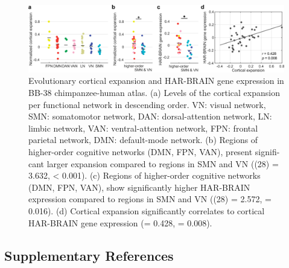 \begin{refsection}
\begin{figure}[H]
    \centering
    \includegraphics[width=\linewidth]{images/harFigS14.png}
    \caption{Evolutionary cortical expansion and HAR-BRAIN gene expression in BB-38 chimpanzee-human atlas. (a) Levels of the cortical expansion per functional network in descending order. VN: visual network, SMN: somatomotor network, DAN: dorsal-attention network, LN: limbic network, VAN: ventral-attention network, FPN: frontal parietal network, DMN: default-mode network. (b) Regions of higher-order cognitive networks (DMN, FPN, VAN), present signifi-cant larger expansion compared to regions in SMN and VN (\tvaldf(28) = 3.632, \pval < 0.001). (c) Regions of higher-order cognitive networks (DMN, FPN, VAN), show significantly higher HAR-BRAIN expression compared to regions in SMN and VN (\tvaldf(28) = 2.572, \pval = 0.016). (d) Cortical expansion significantly correlates to cortical HAR-BRAIN gene expression (\rval = 0.428, \pval = 0.008).}
    \label{harFigs14}
\end{figure}

\newpage
\subsection*{Supplementary References}
\printbibliography[heading=none]

\end{refsection}

